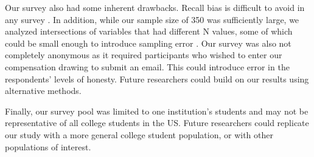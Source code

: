 Our survey also had some inherent drawbacks. Recall bias is difficult to avoid
in any survey \cite{lazar_28}. In addition, while our sample size of 350 was sufficiently
large, we analyzed intersections of variables that had different N values,
some of which could be small enough to introduce sampling error \cite{lazar_28}. Our
survey was also not completely anonymous as it required participants who
wished to enter our compensation drawing to submit an email. This could
introduce error in the respondents' levels of honesty. Future researchers
could build on our results using alternative methods.

Finally, our survey pool was limited to one institution's students and may not be representative of all college students in the US. Future researchers could replicate our study
with a more general college student population, or with other populations of
interest.
